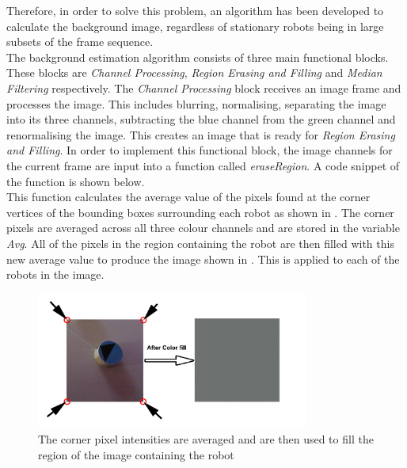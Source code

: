 \documentclass{article}
\begin{document}
Therefore, in order to solve this problem, an algorithm has been developed to calculate the background image, regardless of stationary robots being in large subsets of the frame sequence. \\

The background estimation algorithm consists of three main functional blocks. These blocks are \textit{Channel Processing}, \textit{Region Erasing and Filling} and \textit{Median Filtering} respectively. The \textit{Channel Processing} block receives an image frame and processes the image. This includes blurring, normalising, separating the image into its three channels, subtracting the blue channel from the green channel and renormalising the image. This creates an image that is ready for \textit{Region Erasing and Filling}. In order to implement this functional block, the image channels for the current frame are input into a function called \textit{eraseRegion}. A code snippet of the function is shown below.\\



This function calculates the average value of the pixels found at the corner vertices of the bounding boxes surrounding each robot as shown in . The corner pixels are averaged across all three colour channels and are stored in the variable \textit{Avg}. All of the pixels in the region containing the robot are then filled with this new average value to produce the image shown in . This is applied to each of the robots in the image. \\

\begin{figure}[h!]
	\centering
		\includegraphics[width=0.8\textwidth]{../Drawings/backgroundErasingMain.pdf}
	\caption{The corner pixel intensities are averaged and are then used to fill the region of the image containing the robot}
	\label{fig:vertices}
\end{figure}
\end{document}
